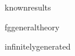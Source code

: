 \documentclass[12 pt,oneside]{book}
\begin{document}
{knownresults}

{fggeneraltheory}

{infinitelygenerated}
\end{document}

